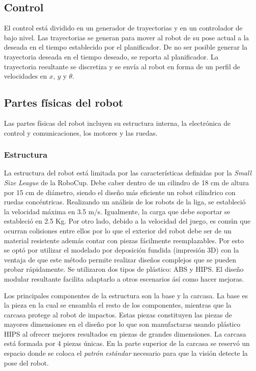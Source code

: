 \documentclass[twocolumn,10pt]{amrob}
\begin{document}
\subsection*{Control}
El control está dividido en un generador de trayectorias y en un controlador de bajo nivel. Las trayectorias se generan para mover al robot de su pose actual a la deseada en el tiempo establecido por el planificador. De no ser posible generar la trayectoria deseada en el tiempo deseado, se reporta al planificador. La trayectoria resultante se discretiza y se envía al robot en forma de un perfil de velocidades en $x$, $y$ y $\theta$. 
 
\subsection*{Partes físicas del robot}
Las partes físicas del robot incluyen su estructura interna, la electrónica de control y comunicaciones, los motores y las ruedas.

\subsubsection*{Estructura} La estructura del robot está limitada por las características definidas por la \textit{Small Size League} de la RoboCup. Debe caber dentro de un cilindro de 18 cm de altura por 15 cm de diámetro, siendo el diseño más eficiente un robot cilíndrico con ruedas concéntricas.
Realizando un análisis de los robots de la liga, se estableció la velocidad máxima en 3.5 m/s. Igualmente, la carga que debe soportar se estableció en 2.5 Kg. Por otro lado, debido a la velocidad del juego, es común que ocurran colisiones entre ellos por lo que el exterior del robot debe ser de un material resistente además contar con piezas fácilmente reemplazables. Por esto se optó por utilizar el modelado por deposición fundida (impresión 3D) con la ventaja de que este método permite realizar diseños complejos que se pueden probar rápidamente. Se utilizaron dos tipos de plástico: ABS y HIPS. El diseño modular resultante facilita adaptarlo a otros escenarios ásí como hacer mejoras. 

Los principales componentes de la estructura son la base y la carcasa. La base es la pieza en la cual se ensambla el resto de los componentes, mientras que la carcasa protege al robot de impactos. Estas piezas constituyen las piezas de mayores dimensiones en el diseño por lo que son manufactaras usando plástico HIPS al ofrecer mejores resultados en piezas de grandes dimensiones. La carcasa est\'a formada por 4 piezas \'unicas. En la parte superior de la carcasa se reservó un espacio donde se coloca el \textit{patrón estándar} necesario para que la visi\'on detecte la pose del robot.
\end{document}
